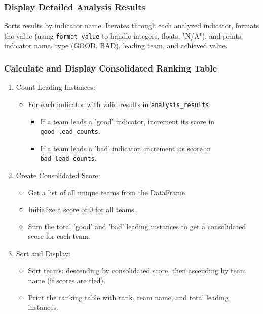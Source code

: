 \documentclass[12pt, a4paper]{report}
\begin{document}
\subsubsection*{Display Detailed Analysis Results}
Sorts results by indicator name.
Iterates through each analyzed indicator, formats the value (using \texttt{format\_value} to handle integers, floats, "N/A"), and prints: indicator name, type (GOOD, BAD), leading team, and achieved value.

\subsubsection*{Calculate and Display Consolidated Ranking Table}
\begin{enumerate}[label*=\textbf{Step \arabic*:}, leftmargin=*]
    \item Count Leading Instances:
    \begin{itemize}[leftmargin=0em]
        \item For each indicator with valid results in \texttt{analysis\_results}:
        \begin{itemize}
            \item If a team leads a 'good' indicator, increment its score in \texttt{good\_lead\_counts}.
            \item If a team leads a 'bad' indicator, increment its score in \texttt{bad\_lead\_counts}.
        \end{itemize}
    \end{itemize}
    \item Create Consolidated Score:
    \begin{itemize}[leftmargin=0em]
        \item Get a list of all unique teams from the DataFrame.
        \item Initialize a score of 0 for all teams.
        \item Sum the total 'good' and 'bad' leading instances to get a consolidated score for each team.
    \end{itemize}
    \item Sort and Display:
    \begin{itemize}[leftmargin=0em]
        \item Sort teams: descending by consolidated score, then ascending by team name (if scores are tied).
        \item Print the ranking table with rank, team name, and total leading instances.
    \end{itemize}
\end{enumerate}
\end{document}
